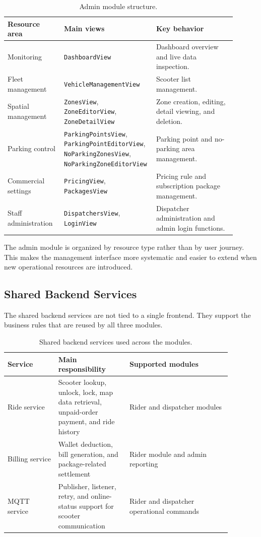 \documentclass[12pt,a4paper]{article}
\begin{document}
\begin{table}[H]
\centering
\begin{tabular}{p{0.24\linewidth} p{0.32\linewidth} p{0.34\linewidth}}
\toprule
\textbf{Resource area} & \textbf{Main views} & \textbf{Key behavior} \\
\midrule
Monitoring & \texttt{DashboardView} & Dashboard overview and live data inspection. \\
Fleet management & \texttt{VehicleManagementView} & Scooter list management. \\
Spatial management & \texttt{ZonesView}, \texttt{ZoneEditorView}, \texttt{ZoneDetailView} & Zone creation, editing, detail viewing, and deletion. \\
Parking control & \texttt{ParkingPointsView}, \texttt{ParkingPointEditorView}, \texttt{NoParkingZonesView}, \texttt{NoParkingZoneEditorView} & Parking point and no-parking area management. \\
Commercial settings & \texttt{PricingView}, \texttt{PackagesView} & Pricing rule and subscription package management. \\
Staff administration & \texttt{DispatchersView}, \texttt{LoginView} & Dispatcher administration and admin login functions. \\
\bottomrule
\end{tabular}
\caption{Admin module structure.}
\end{table}

The admin module is organized by resource type rather than by user journey. This makes the management interface more systematic and easier to extend when new operational resources are introduced.

\subsection{Shared Backend Services}

The shared backend services are not tied to a single frontend. They support the business rules that are reused by all three modules.

\begin{table}[H]
\centering
\begin{tabular}{p{0.20\linewidth} p{0.28\linewidth} p{0.40\linewidth}}
\toprule
\textbf{Service} & \textbf{Main responsibility} & \textbf{Supported modules} \\
\midrule
Ride service & Scooter lookup, unlock, lock, map data retrieval, unpaid-order payment, and ride history & Rider and dispatcher modules \\
Billing service & Wallet deduction, bill generation, and package-related settlement & Rider module and admin reporting \\
MQTT service & Publisher, listener, retry, and online-status support for scooter communication & Rider and dispatcher operational commands \\
\bottomrule
\end{tabular}
\caption{Shared backend services used across the modules.}
\end{table}
\end{document}
